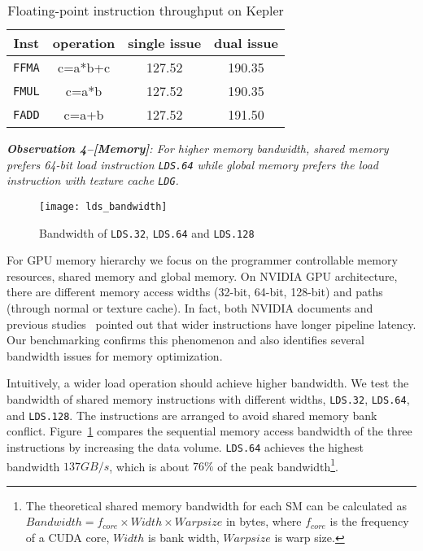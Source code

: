\begin{table}[htbp]
\caption{Floating-point instruction throughput on Kepler}
\centering
\scalebox{0.9} {
\begin{tabular}{|c|c|c|c|}
\hline
Inst &operation&single issue&dual issue\\
\hline
{\tt FFMA} &c=a*b+c&127.52&190.35 \\
\hline
{\tt FMUL} &c=a*b&127.52&190.35 \\
\hline
{\tt FADD} &c=a+b&127.52&191.50\\
\hline
\end{tabular}
}
\label{tab:ffma}
\end{table}

{\em {\bf Observation 4--[Memory]}: For higher memory bandwidth, shared memory prefers 64-bit load
instruction {\tt LDS.64} while global memory prefers the load instruction with texture cache {\tt LDG}.}

\begin{figure}[htbp]
\begin{center}
\texttt{[image: lds\_bandwidth]}
    \caption{ Bandwidth of {\tt LDS.32}, {\tt LDS.64} and {\tt LDS.128}}
\label{fig:lds_bw}
\end{center}
\end{figure}

For GPU memory hierarchy we focus on the programmer controllable memory resources, shared memory and global memory.
On NVIDIA GPU architecture, there are different memory access widths (32-bit, 64-bit, 128-bit) and paths (through normal or texture cache).
In fact, both NVIDIA documents and previous studies~\cite{tan} pointed out that wider
instructions have longer pipeline latency.
Our benchmarking confirms this phenomenon and also identifies several bandwidth issues for memory optimization.

Intuitively, a wider load operation should achieve higher bandwidth.
We test the bandwidth of shared memory instructions with different widths, {\tt LDS.32}, {\tt LDS.64},
and {\tt LDS.128}.
The instructions are arranged to avoid shared memory bank conflict.
Figure~\ref{fig:lds_bw} compares the sequential memory access bandwidth of the three instructions by increasing the data volume.
{\tt LDS.64} achieves the highest bandwidth $137GB/s$, which is about $76\%$ of the peak bandwidth\footnote{The
theoretical shared memory bandwidth for each SM can be calculated as $Bandwidth = f_{core} \times Width \times Warpsize$ in
bytes, where $f_{core}$ is the frequency of a CUDA core, $Width$ is bank width, $Warpsize$ is warp size.}.

